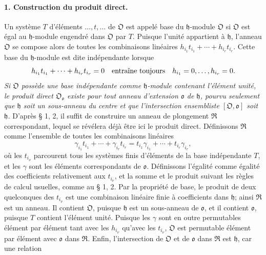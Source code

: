 \paragraph{1. Construction du produit direct.}
Un système \(T\) d'éléments \(\ldots,t,\ldots\) de \(\mathfrak O\) est appelé base du \(\mathfrak h\)-module \(\mathfrak O\) si \(\mathfrak O\) est égal au \(\mathfrak h\)-module engendré dans \(\mathfrak O\) par \(T\). Puisque l'unité appartient à \(\mathfrak h\), l'anneau \(\mathfrak O\) se compose alors de toutes les combinaisons linéaires \(h_{i_1}t_{i_1}+\cdots+h_{i_r}t_{i_r}\). Cette base du \(\mathfrak h\)-module est dite indépendante lorsque
\[
h_{i_1}t_{i_1}+\cdots+h_{i_r}t_{i_r}=0
\quad\hbox{entraîne toujours}\quad
h_{i_1}=0,\ldots,h_{i_r}=0.
\]
\emph{Si \(\mathfrak O\) possède une base indépendante comme \(\mathfrak h\)-module contenant l'élément unité, le produit direct \(\mathfrak O_{\mathfrak o}\) existe pour tout anneau d'extension \(\mathfrak o\) de \(\mathfrak h\), pourvu seulement que \(\mathfrak h\) soit un sous-anneau du centre et que l'intersection ensembliste \([\mathfrak O,\mathfrak o]\) soit \(\mathfrak h\).} D'après \S{} 1, 2, il suffit de construire un anneau de plongement \(\mathfrak R\) correspondant, lequel se révélera déjà être ici le produit direct. Définissons \(\mathfrak R\) comme l'ensemble de toutes les combinaisons linéaires
\[
\gamma_{i_1}t_{i_1}+\cdots+\gamma_{i_r}t_{i_r}
=t_{i_1}\gamma_{i_1}+\cdots+t_{i_r}\gamma_{i_r},
\]
où les \(t_{i_\nu}\) parcourent tous les systèmes finis d'éléments de la base indépendante \(T\), et les \(\gamma\) sont les éléments correspondants de \(\mathfrak o\). Définissons l'égalité comme égalité des coefficients relativement aux \(t_{i_\nu}\), et la somme et le produit suivant les règles de calcul usuelles, comme au \S{} 1, 2. Par la propriété de base, le produit de deux quelconques des \(t_{i_\nu}\) est une combinaison linéaire finie à coefficients dans \(\mathfrak h\); ainsi \(\mathfrak R\) est un anneau. Il contient \(\mathfrak O\), puisque \(\mathfrak h\) est un sous-anneau de \(\mathfrak o\), et il contient \(\mathfrak o\), puisque \(T\) contient l'élément unité. Puisque les \(\gamma\) sont en outre permutables élément par élément tant avec les \(h_{i_\nu}\) qu'avec les \(t_{i_\nu}\), \(\mathfrak O\) est permutable élément par élément avec \(\mathfrak o\) dans \(\mathfrak R\). Enfin, l'intersection de \(\mathfrak O\) et de \(\mathfrak o\) dans \(\mathfrak R\) est \(\mathfrak h\), car une relation
